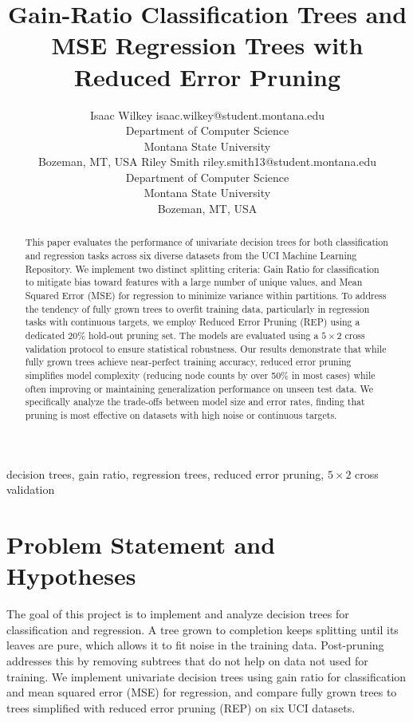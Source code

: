 \documentclass[twoside,11pt]{article}
\begin{document}
\title{Gain-Ratio Classification Trees and MSE Regression Trees with Reduced Error Pruning}

\author{\name Isaac Wilkey \email isaac.wilkey@student.montana.edu\\
\addr Department of Computer Science \\
Montana State University \\
Bozeman, MT, USA
\AND
\name Riley Smith \email riley.smith13@student.montana.edu\\
\addr Department of Computer Science \\
Montana State University \\
Bozeman, MT, USA
}

\maketitle

\begin{abstract}
This paper evaluates the performance of univariate decision trees for both classification and regression tasks across six diverse datasets from the UCI Machine Learning Repository. We implement two distinct splitting criteria: Gain Ratio for classification to mitigate bias toward features with a large number of unique values, and Mean Squared Error (MSE) for regression to minimize variance within partitions. To address the tendency of fully grown trees to overfit training data, particularly in regression tasks with continuous targets, we employ Reduced Error Pruning (REP) using a dedicated 20\% hold-out pruning set. The models are evaluated using a $5 \times 2$ cross validation protocol to ensure statistical robustness. Our results demonstrate that while fully grown trees achieve near-perfect training accuracy, reduced error pruning simplifies model complexity (reducing node counts by over 50\% in most cases) while often improving or maintaining generalization performance on unseen test data. We specifically analyze the trade-offs between model size and error rates, finding that pruning is most effective on datasets with high noise or continuous targets.

\end{abstract}

\begin{keywords}
decision trees, gain ratio, regression trees, reduced error pruning, $5 \times 2$ cross validation
\end{keywords}

\section{Problem Statement and Hypotheses}
The goal of this project is to implement and analyze decision trees for classification and regression. A tree grown to completion keeps splitting until its leaves are pure, which allows it to fit noise in the training data. Post-pruning addresses this by removing subtrees that do not help on data not used for training. We implement univariate decision trees using gain ratio for classification and mean squared error (MSE) for regression, and compare fully grown trees to trees simplified with reduced error pruning (REP) on six UCI datasets.
\end{document}
